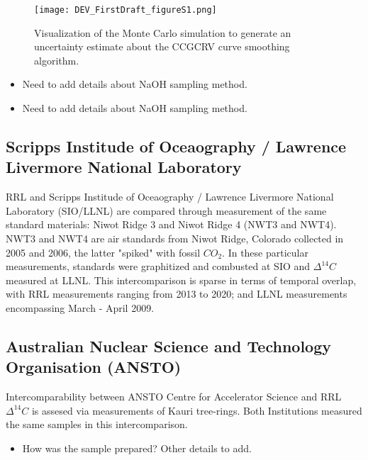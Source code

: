 \documentclass{BrJG_submit}
\begin{document}
\begin{figure*}[!t]								%
\centering
\texttt{[image: DEV\_FirstDraft\_figureS1.png]} %
\caption{Visualization of the Monte Carlo simulation to generate an uncertainty estimate about the CCGCRV curve smoothing algorithm.}	%
\label{fig:montecarloexplained}									%
\end{figure*}


\begin{itemize}
	\item Need to add details about NaOH sampling method. 
\end{itemize}

\begin{itemize}
	\item Need to add details about NaOH sampling method. 
\end{itemize}


\subsection{Scripps Institude of Oceaography / Lawrence Livermore National Laboratory}

RRL and Scripps Institude of Oceaography / Lawrence Livermore National Laboratory (SIO/LLNL) are compared through measurement of the same standard materials: Niwot Ridge 3 and Niwot Ridge 4 (NWT3 and NWT4). NWT3 and NWT4 are air standards from Niwot Ridge, Colorado collected in 2005 and 2006, the latter "spiked" with fossil ${CO_{2}}$. In these particular measurements, standards were graphitized and combusted at SIO and ${\Delta^{14}C}$ measured at LLNL. This intercomparison is sparse in terms of temporal overlap, with RRL measurements ranging from 2013 to 2020; and LLNL measurements encompassing March - April 2009. 
\subsection{Australian Nuclear Science and Technology Organisation (ANSTO)}

Intercomparability between ANSTO Centre for Accelerator Science and RRL ${\Delta^{14}C}$ is assesed via measurements of Kauri tree-rings. Both Institutions measured the same samples in this intercomparison.   
\begin{itemize}
	\item How was the sample prepared? Other details to add. 
\end{itemize}
\end{document}
